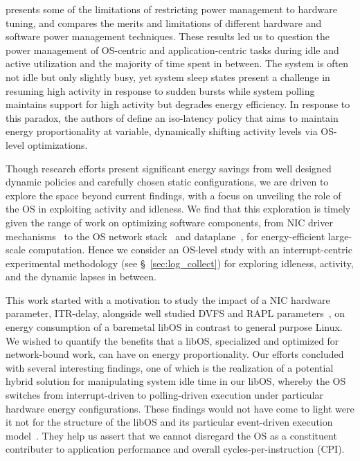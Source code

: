 \cite{oldi-study} presents some of the limitations of
restricting power management to hardware tuning,
and \cite{powercap} compares the merits and limitations of
different hardware and software power management techniques.
These results led us to question
the power management of OS-centric and application-centric tasks
during idle and active utilization
and the majority of time spent in between.
The system is often not idle but only slightly busy,
yet system sleep states present a challenge in
resuming high activity in response to sudden bursts
while system polling maintains support for high activity
but degrades energy efficiency.
In response to this paradox,
the authors of \cite{oldi-pegasus} define an iso-latency policy
that aims to maintain energy proportionality
at variable, dynamically shifting activity levels
via OS-level optimizations.

Though research efforts present significant energy savings
from well designed dynamic policies
and carefully chosen static configurations,
we are driven to explore the space beyond current findings,
with a focus on unveiling the role of the OS
in exploiting activity and idleness.
We find that this exploration is timely
given the range of work on optimizing software components,
from NIC driver mechanisms~\cite{flexnic, affinityaccept, network-latency}
to the OS network stack~\cite{mtcp, sandstorm, network-latency}
and dataplane~\cite{ix, ixOS, arrakis},
for energy-efficient large-scale computation.
Hence we consider an OS-level study
with an interrupt-centric experimental methodology (see \S~\ref{sec:log_collect}) 
for exploring idleness, activity, and the dynamic lapses in between.



This work
started with a motivation to study the impact
of a NIC hardware parameter, ITR-delay,
alongside well studied DVFS and RAPL parameters~\cite{rapl2015, rapl2018},
on energy consumption
of a baremetal libOS in contrast to general purpose Linux.
We wished to quantify the benefits that a libOS,
specialized and optimized for network-bound work,
can have on energy proportionality.
Our efforts concluded with several interesting findings,
one of which is the realization of a potential hybrid solution
for manipulating system idle time in our libOS,
whereby the OS switches from interrupt-driven
to polling-driven execution
under particular hardware energy configurations.
These findings would not have come to light
were it not for the structure of the libOS
and its particular event-driven execution model~\cite{seda, unikernels}.
They help us assert that we cannot disregard the OS
as a constituent contributer to application performance and overall cycles-per-instruction (CPI).


